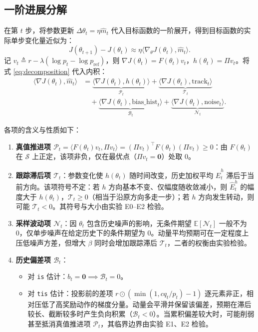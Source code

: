 \documentclass[11pt, a4paper, UTF8]{ctexart}
\begin{document}
\subsection{一阶进展分解}

在第 $t$ 步，将参数更新 $\Delta \theta_t = \eta \hat{m}_t$ 代入目标函数的一阶展开，得到目标函数的实际单步变化量近似为：
\begin{equation}
    J(\theta_{t+1}) - J(\theta_t) \approx \eta \langle \nabla_\theta J(\theta_t), \hat{m}_t \rangle.
\end{equation}
记 $v_t \triangleq r - \lambda(\log p_t - \log p_{\mathrm{ref}})$，则 $\nabla J(\theta_t) = F(\theta_t) v_t$，$h(\theta_t) = \Pi v_t$。将式 \eqref{eq:decomposition} 代入内积：
\begin{equation}
\begin{aligned}
    \langle \nabla J(\theta_t), \hat{m}_t \rangle
    &= \underbrace{\langle \nabla J(\theta_t), h(\theta_t) \rangle}_{\mathcal{P}_t} + \underbrace{\langle \nabla J(\theta_t), \mathrm{track}_t \rangle}_{\mathcal{T}_t} \\
    &\quad + \underbrace{\langle \nabla J(\theta_t), \mathrm{bias\_hist}_t \rangle}_{\mathcal{B}_t} + \underbrace{\langle \nabla J(\theta_t), \mathrm{noise}_t \rangle}_{\mathcal{N}_t}.
\end{aligned}
    \label{eq:inner_product}
\end{equation}

各项的含义与性质如下：
\begin{enumerate}[leftmargin=2em]
    \item \textbf{真值推进项 $\mathcal{P}_t = \langle F(\theta_t)v_t, \Pi v_t \rangle = (\Pi v_t)^\top F(\theta_t) (\Pi v_t) \ge 0$}：由 $F(\theta_t)$ 在 $\mathcal{S}$ 上正定，该项非负，仅在最优点（$\Pi v_t = \mathbf{0}$）处取 0。
    \item \textbf{跟踪滞后项 $\mathcal{T}_t$}：参数变化使 $h(\theta_t)$ 随时间改变，历史加权平均 $\hat{E}^h_t$ 滞后于当前方向。该项符号不定：若 $h$ 方向基本不变、仅幅度随收敛减小，则 $\hat{E}^h_t$ 的幅度大于 $h(\theta_t)$，$\mathcal{T}_t \ge 0$（相当于沿原方向多走一步）；若 $h$ 方向发生转动，则可能 $\mathcal{T}_t < 0$。其符号与大小由实验 E0--E2 检验。
    \item \textbf{采样波动项 $\mathcal{N}_t$}：因 $\theta_t$ 包含历史噪声的影响，无条件期望 $\mathbb{E}[\mathcal{N}_t]$ 一般不为 0，仅单步噪声在给定历史下的条件期望为 0。动量平均预期可在一定程度上压低噪声方差，但增大 $\beta$ 同时会增加跟踪滞后 $\mathcal{T}_t$，二者的权衡由实验检验。
    \item \textbf{历史偏差项 $\mathcal{B}_t$}：
    \begin{itemize}
        \item 对 \texttt{is} 估计：$b_t = \mathbf{0} \implies \mathcal{B}_t = 0$。
        \item 对 \texttt{tis} 估计：投影前的差项 $r \odot (\min(1, c q_t / p_t) - 1)$ 逐元素非正，相对压低了高奖励动作的梯度分量。动量会平滑并保留该偏差，预期在滞后较长、截断较多时产生负向积累（$\mathcal{B}_t < 0$）。当累积偏差较大时，可能削弱甚至抵消真值推进项 $\mathcal{P}_t$，其临界边界由实验 E1、E2 检验。
    \end{itemize}
\end{enumerate}
\end{document}
